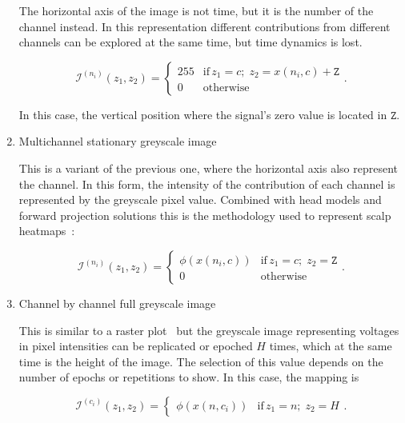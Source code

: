 \begin{enumerate}
The horizontal axis of the image is not time, but it is the number of the channel instead.   In this representation different contributions from different channels can be explored at the same time, but time dynamics is lost.  

\begin{equation}
\mathcal{I}^{(n_i)}(z_1,z_2) = \left\{ \begin{array}{rl}
255 & \text{if} \,  z_1 = c; \; z_2 =  x(n_i,c) + \mathtt{Z} \\
0   & \mbox{otherwise}
\end{array}\right ..
\label{eq:image4}
\end{equation}

In this case, the vertical position where the signal's zero value is located in $\mathtt{Z}$.

\item Multichannel stationary greyscale image

This is a variant of the previous one, where the horizontal axis also represent the channel.   In this form, the intensity of the contribution of each channel is represented by the greyscale pixel value.  Combined with head models and forward projection solutions this is the methodology used to represent scalp heatmaps~\cite{Gramfort2013}:

\begin{equation}
\mathcal{I}^{(n_i)}(z_1,z_2)= \left\{ \begin{array}{rl}
\phi(x(n_i,c)) & \text{if} \,  z_1 = c; \; z_2 =  \mathtt{Z} \\
0   & \mbox{otherwise}
\end{array}\right ..
\label{eq:image5}
\end{equation}


\item Channel by channel full greyscale image

This is similar to a raster plot~\cite{Cohen2014} but the greyscale image representing voltages in pixel intensities can be replicated or epoched $H$ times, which at the same time is the height of the image.  The selection of this value depends on the number of epochs or repetitions to show.  In this case, the mapping is

\begin{equation}
\mathcal{I}^{(c_i)}(z_1,z_2) = \left\{ \begin{array}{rl} \phi(x(n,c_i))  & \text{if} \,  z_1 = n; \; z_2 = H \end{array}\right. .
\label{eq:image6}
\end{equation}


\end{enumerate}


